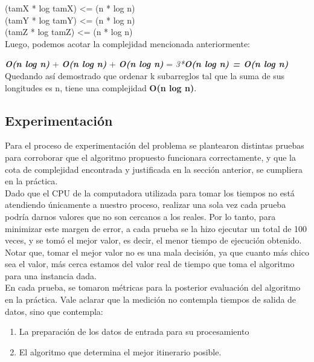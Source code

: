 \indent (tamX * log tamX) \textless = (n * log n)\\
\indent (tamY * log tamY) \textless = (n * log n)\\
\indent (tamZ * log tamZ) \textless = (n * log n)\\

\noindent Luego, podemos acotar la complejidad mencionada anteriormente:

\indent \textit{\textbf{O(n log n)}} + \textit{\textbf{O(n log n)}} + \textit{\textbf{O(n log n)}} = \textit{3*\textbf{O(n log n) = O(n log n)}}\\

\noindent Quedando así demostrado que ordenar k subarreglos tal que la suma de sus longitudes es n, tiene una complejidad \textbf{O(n log n)}.

\newpage
\subsection{Experimentación}

\noindent Para el proceso de experimentación del problema se plantearon distintas pruebas para corroborar que el algoritmo propuesto funcionara correctamente, y que la cota de complejidad encontrada y justificada en la sección anterior, se cumpliera en la práctica.\\

\noindent Dado que el CPU de la computadora utilizada para tomar los tiempos no está atendiendo únicamente a nuestro proceso, realizar una sola vez cada prueba podría darnos valores que no son cercanos a los reales. Por lo tanto, para minimizar este margen de error, a cada prueba se la hizo ejecutar un total de 100 veces, y se tomó el mejor valor, es decir, el menor tiempo de ejecución obtenido. Notar que, tomar el mejor valor no es una mala decisión, ya que cuanto más chico sea el valor, más cerca estamos del valor real de tiempo que toma el algoritmo para una instancia dada.\\

\noindent En cada prueba, se tomaron métricas para la posterior evaluación del algoritmo en la práctica. Vale aclarar que la medición no contempla tiempos de salida de datos, sino que contempla:\\

\noindent \begin{enumerate}
\item La preparación de los datos de entrada para su procesamiento
\item El algoritmo que determina el mejor itinerario posible.\\
\end{enumerate}

